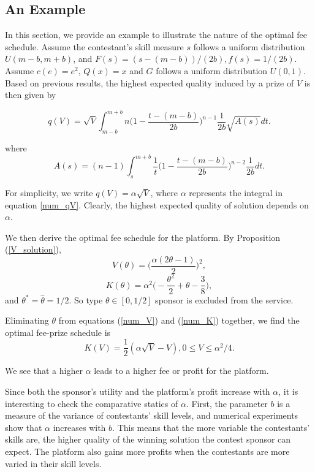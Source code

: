 \documentclass[12pt]{article}
\begin{document}
\subsection{An Example}

In this section, we provide an example to illustrate the nature of
the optimal fee schedule. Assume the contestant's skill measure $s$
follows a uniform distribution $U(m-b,m+b)$, and $F(s)=(s-(m-b))/(2b),f(s)=1/(2b)$.
Assume $c(e)=e^{2}$, $Q(x)=x$ and $G$ follows a uniform distribution
$U(0,1)$. Based on previous results, the highest expected quality induced by a prize of $V$ is then given by

\begin{equation}
q(V)=\sqrt{V}\int_{m-b}^{m+b}n\Big(1-\frac{t-(m-b)}{2b}\Big)^{n-1}\frac{1}{2b}\sqrt{A(s)}dt.\label{num_qV}
\end{equation}

where \[
A(s)=(n-1)\int_{s}^{m+b}\frac{1}{t}\Big(1-\frac{t-(m-b)}{2b}\Big)^{n-2}\frac{1}{2b}dt.
\]

For simplicity, we write $q(V)=\alpha\sqrt{V}$, where $\alpha$ represents
the integral in equation \ref{num_qV}. Clearly, the highest expected quality of solution depends on $\alpha$.

We then derive the optimal fee schedule for the platform. By Proposition (\ref{V_solution}),
\begin{equation}
V(\theta)=\Big(\frac{\alpha(2\theta-1)}{2}\Big)^{2},\label{num_V}
\end{equation}
\begin{equation}
K(\theta)=\alpha^{2}\Big(-\frac{\theta^{2}}{2}+\theta-\frac{3}{8}\Big),\label{num_K}
\end{equation}
and $\theta^{*}=\hat{\theta}=1/2$. So type $\theta\in[0,1/2]$ sponsor
is excluded from the service.

Eliminating $\theta$ from equations (\ref{num_V}) and (\ref{num_K}) together, we find the optimal fee-prize schedule is
\begin{equation}
K(V)=\frac{1}{2}(\alpha\sqrt{V}-V),0\leq V\leq\alpha^{2}/4.
\end{equation}

We see that a higher $\alpha$ leads to a higher fee or profit for the platform.

Since both the sponsor's utility and the platform's profit increase with $\alpha$, it is interesting to check the comparative statics of $\alpha$. First, the parameter $b$ is a measure of the variance of contestants' skill levels, and numerical experiments show that $\alpha$ increases with $b$. This means that the more variable the contestants' skills are, the higher quality of the winning solution the contest sponsor can expect.  The platform also gains more profits when the contestants are more varied in their skill levels.
\end{document}
